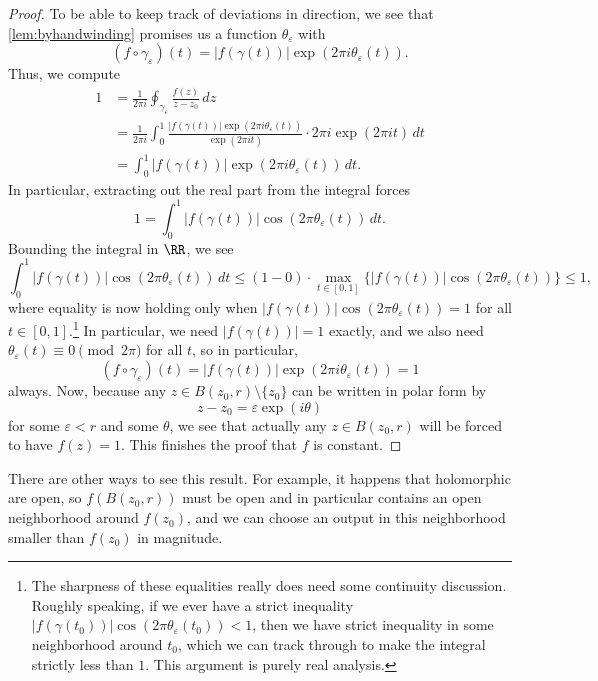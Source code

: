 \begin{proof}
	To be able to keep track of deviations in direction, we see that \autoref{lem:byhandwinding} promises us a function $\theta_\varepsilon$ with
	\[(f\circ\gamma_\varepsilon)(t)=|f(\gamma(t))|\exp(2\pi i\theta_\varepsilon(t)).\]
	Thus, we compute
	\begin{align*}
		1 &= \frac1{2\pi i}\oint_{\gamma_\varepsilon}\frac{f(z)}{z-z_0}\,dz \\
		&= \frac1{2\pi i}\int_0^1\frac{|f(\gamma(t))|\exp(2\pi i\theta_\varepsilon(t))}{\exp(2\pi it)}\cdot2\pi i\exp(2\pi it)\,dt \\
		&= \int_0^1|f(\gamma(t))|\exp(2\pi i\theta_\varepsilon(t))\,dt.
	\end{align*}
	In particular, extracting out the real part from the integral forces
	\[1=\int_0^1|f(\gamma(t))|\cos(2\pi\theta_\varepsilon(t))\,dt.\]
	Bounding the integral in $\RR$, we see
	\[\int_0^1|f(\gamma(t))|\cos(2\pi\theta_\varepsilon(t))\,dt\le(1-0)\cdot\max_{t\in[0,1]}\big\{|f(\gamma(t))|\cos(2\pi\theta_\varepsilon(t))\big\}\le1,\]
	where equality is now holding only when $|f(\gamma(t))|\cos(2\pi\theta_\varepsilon(t))=1$ for all $t\in[0,1]$.\footnote{The sharpness of these equalities really does need some continuity discussion. Roughly speaking, if we ever have a strict inequality $|f(\gamma(t_0))|\cos(2\pi\theta_\varepsilon(t_0))<1$, then we have strict inequality in some neighborhood around $t_0$, which we can track through to make the integral strictly less than $1$. This argument is purely real analysis.} In particular, we need $|f(\gamma(t))|=1$ exactly, and we also need $\theta_\varepsilon(t)\equiv0\pmod{2\pi}$ for all $t$, so in particular,
	\[(f\circ\gamma_\varepsilon)(t)=|f(\gamma(t))|\exp(2\pi i\theta_\varepsilon(t))=1\]
	always. Now, because any $z\in B(z_0,r)\setminus\{z_0\}$ can be written in polar form by
	\[z-z_0=\varepsilon\exp(i\theta)\]
	for some $\varepsilon<r$ and some $\theta$, we see that actually any $z\in B(z_0,r)$ will be forced to have $f(z)=1$. This finishes the proof that $f$ is constant.
\end{proof}
\begin{remark}[Nir]
	There are other ways to see this result. For example, it happens that holomorphic are open, so $f(B(z_0,r))$ must be open and in particular contains an open neighborhood around $f(z_0)$, and we can choose an output in this neighborhood smaller than $f(z_0)$ in magnitude.
\end{remark}

